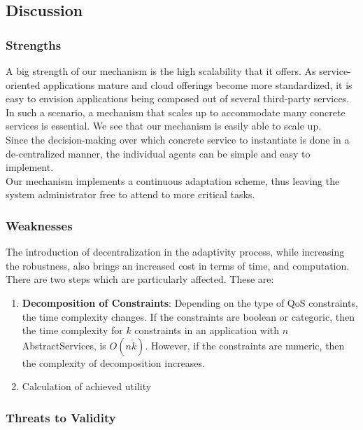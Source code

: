 \documentclass[10pt,journal,compsoc]{IEEEtran}
\begin{document}
\subsection{Discussion}
\subsubsection{Strengths}
A big strength of our mechanism is the high scalability that it offers. As service-oriented applications mature and cloud offerings become more standardized, it is easy to envision applications being composed out of several third-party services. In such a scenario, a mechanism that scales up to accommodate many concrete services is essential. We see that our mechanism is easily able to scale up.\\
Since the decision-making over which concrete service to instantiate is done in a de-centralized manner, the individual agents can be simple and easy to implement. \\    
Our mechanism implements a continuous adaptation scheme, thus leaving the system administrator free to attend to more critical tasks.

\subsubsection{Weaknesses}
The introduction of decentralization in the adaptivity process, while increasing the robustness, also brings an increased cost in terms of time, and computation. There are two steps which are particularly affected. These are: 
\begin{enumerate}
    \item \textbf{Decomposition of Constraints}: Depending on the type of QoS constraints, the time complexity changes. If the constraints are boolean or categoric, then the time complexity for $k$ constraints in an application with $n$ AbstractServices, is $O(n \dot k)$. However, if the constraints are numeric, then the complexity of decomposition increases. 
    \item Calculation of achieved utility
\end{enumerate}


\subsubsection{Threats to Validity}
\end{document}
